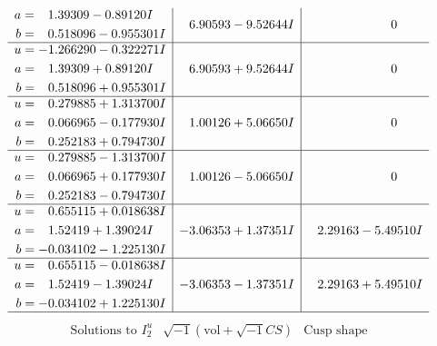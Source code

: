 \documentclass[1p]{elsarticle_modified}
\theoremstyle{definition}
\newcommand{\I}{\sqrt{-1}}
\begin{document}
$$\begin{array}{c|c|c}
\begin{aligned}
a &= \phantom{-}1.39309 - 0.89120 I \\
b &= \phantom{-}0.518096 - 0.955301 I\end{aligned}
 & \phantom{-}6.90593 - 9.52644 I & \phantom{-0.000000 } 0 \\ \hline\begin{aligned}
u &= -1.266290 - 0.322271 I \\
a &= \phantom{-}1.39309 + 0.89120 I \\
b &= \phantom{-}0.518096 + 0.955301 I\end{aligned}
 & \phantom{-}6.90593 + 9.52644 I & \phantom{-0.000000 } 0 \\ \hline\begin{aligned}
u &= \phantom{-}0.279885 + 1.313700 I \\
a &= \phantom{-}0.066965 - 0.177930 I \\
b &= \phantom{-}0.252183 + 0.794730 I\end{aligned}
 & \phantom{-}1.00126 + 5.06650 I & \phantom{-0.000000 } 0 \\ \hline\begin{aligned}
u &= \phantom{-}0.279885 - 1.313700 I \\
a &= \phantom{-}0.066965 + 0.177930 I \\
b &= \phantom{-}0.252183 - 0.794730 I\end{aligned}
 & \phantom{-}1.00126 - 5.06650 I & \phantom{-0.000000 } 0 \\ \hline\begin{aligned}
u &= \phantom{-}0.655115 + 0.018638 I \\
a &= \phantom{-}1.52419 + 1.39024 I \\
b &= -0.034102 - 1.225130 I\end{aligned}
 & -3.06353 + 1.37351 I & \phantom{-}2.29163 - 5.49510 I \\ \hline\begin{aligned}
u &= \phantom{-}0.655115 - 0.018638 I \\
a &= \phantom{-}1.52419 - 1.39024 I \\
b &= -0.034102 + 1.225130 I\end{aligned}
 & -3.06353 - 1.37351 I & \phantom{-}2.29163 + 5.49510 I\\
 \hline 
 \end{array}$$\newpage$$\begin{array}{c|c|c}  
\text{Solutions to }I^u_{2}& \I (\text{vol} + \sqrt{-1}CS) & \text{Cusp shape}\\
 \hline 
\begin{aligned}

\end{aligned}
\end{array}$$
\end{document}
